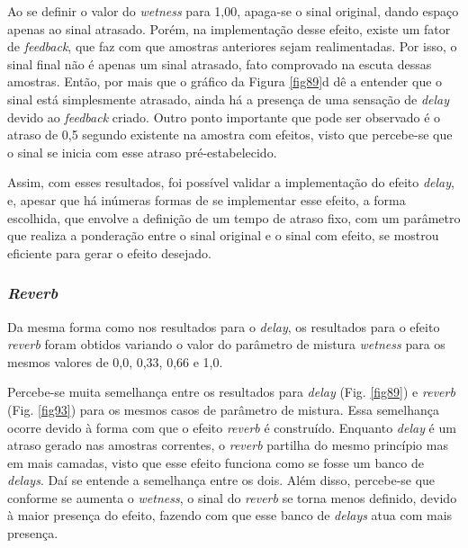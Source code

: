 
Ao se definir o valor do \textit{wetness} para 1,00, apaga-se o sinal original, dando espaço apenas ao sinal atrasado. Porém, na implementação desse efeito, existe um fator de \textit{feedback}, que faz com que amostras anteriores sejam realimentadas. Por isso, o sinal final não é apenas um sinal atrasado, fato comprovado na escuta dessas amostras. Então, por mais que o gráfico da Figura \ref{fig89}d dê a entender que o sinal está simplesmente atrasado, ainda há a presença de uma sensação de \textit{delay} devido ao \textit{feedback} criado. Outro ponto importante que pode ser observado é o atraso de 0,5 segundo existente na amostra com efeitos, visto que percebe-se que o sinal se inicia com esse atraso pré-estabelecido.


Assim, com esses resultados, foi possível validar a implementação do efeito \textit{delay}, e, apesar que há inúmeras formas de se implementar esse efeito, a forma escolhida, que envolve a definição de um tempo de atraso fixo, com um parâmetro que realiza a ponderação entre o sinal original e o sinal com efeito, se mostrou eficiente para gerar o efeito desejado.

\subsubsection*{\textit{Reverb}}

Da mesma forma como nos resultados para o \textit{delay}, os resultados para o efeito \textit{reverb} foram obtidos variando o valor do parâmetro de mistura \textit{wetness} para os mesmos valores de 0,0, 0,33, 0,66 e 1,0.

Percebe-se muita semelhança entre os resultados para \textit{delay} (Fig. \ref{fig89}) e \textit{reverb} (Fig. \ref{fig93}) para os mesmos casos de parâmetro de mistura. Essa semelhança ocorre devido à forma com que o efeito \textit{reverb} é construído. Enquanto \textit{delay} é um atraso gerado nas amostras correntes, o \textit{reverb} partilha do mesmo princípio mas em mais camadas, visto que esse efeito funciona como se fosse um banco de \textit{delays}. Daí se entende a semelhança entre os dois. Além disso, percebe-se que conforme se aumenta o \textit{wetness}, o sinal do \textit{reverb} se torna menos definido, devido à maior presença do efeito, fazendo com que esse banco de \textit{delays} atua com mais presença.

